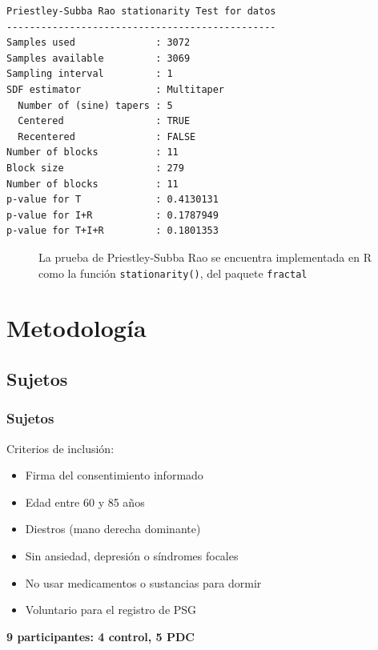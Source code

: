 \documentclass{beamer}
\begin{document}

\begin{lrbox}{\mybox}%
\begin{lstlisting}[caption={}]
Priestley-Subba Rao stationarity Test for datos
-----------------------------------------------
Samples used              : 3072 
Samples available         : 3069 
Sampling interval         : 1 
SDF estimator             : Multitaper 
  Number of (sine) tapers : 5 
  Centered                : TRUE 
  Recentered              : FALSE 
Number of blocks          : 11 
Block size                : 279 
Number of blocks          : 11 
p-value for T             : 0.4130131 
p-value for I+R           : 0.1787949 
p-value for T+I+R         : 0.1801353 
\end{lstlisting}
\end{lrbox}%

\begin{frame}[fragile]
\begin{figure}
\scalebox{0.8}{\usebox{\mybox}}
\caption{La prueba de Priestley-Subba Rao se encuentra implementada en R como la funci\'on 
\texttt{stationarity()}, del paquete \texttt{fractal}}
\end{figure}
\end{frame}


\section{Metodolog\'ia}


\subsection{Sujetos}


\begin{frame}\frametitle{Sujetos}
Criterios de inclusi\'on:
\begin{itemize}
\item Firma del consentimiento informado
\item Edad entre 60 y 85 a\~nos
\item Diestros (mano derecha dominante)
\item Sin ansiedad, depresi\'on o s\'indromes focales
\item No usar medicamentos o sustancias para dormir
\item Voluntario para el registro de PSG
\end{itemize}

\textbf{9 participantes: 4 control, 5 PDC}
\end{frame}
\end{document}
